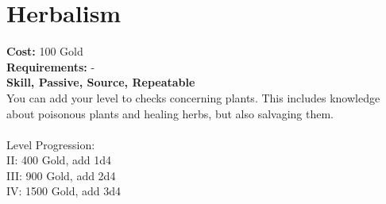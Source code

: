 \section*{Herbalism}
\textbf{Cost:} 100 Gold\\
\textbf{Requirements:} -\\
\textbf{Skill, Passive, Source, Repeatable}\\
You can add your level to checks concerning plants. This includes knowledge about poisonous plants and healing herbs, but also salvaging them.\\
\\
Level Progression:\\
II: 400 Gold, add 1d4\\
III: 900 Gold, add 2d4\\
IV: 1500 Gold, add 3d4\\